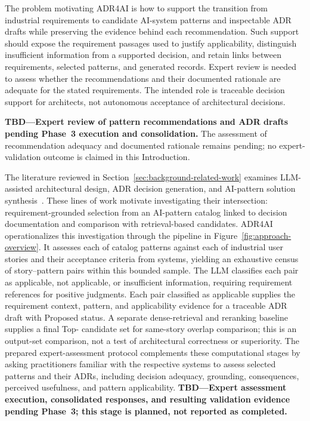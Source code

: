 The problem motivating ADR4AI is how to support the transition from industrial
requirements to candidate AI-system patterns and inspectable ADR drafts while
preserving the evidence behind each recommendation. Such support should expose
the requirement passages used to justify applicability, distinguish insufficient
information from a supported decision, and retain links between requirements,
selected patterns, and generated records. Expert review is needed to assess
whether the recommendations and their documented rationale are adequate for the
stated requirements. The intended role is traceable decision support for
architects, not autonomous acceptance of architectural decisions.

\noindent\textbf{TBD---Expert review of pattern recommendations and ADR drafts
pending Phase~3 execution and consolidation.}
The assessment of recommendation adequacy and documented rationale remains
pending; no expert-validation outcome is claimed in this Introduction.

The literature reviewed in Section~\ref{sec:background-related-work} examines
LLM-assisted architectural design, ADR decision generation, and AI-pattern
solution synthesis~\cite{cervantes2026assistants,dhar2024generating,oliveira2026designpartners}.
These lines of work motivate investigating their intersection: requirement-grounded
selection from an AI-pattern catalog linked to decision documentation and
comparison with retrieval-based candidates. ADR4AI operationalizes this
investigation through the pipeline in Figure~\ref{fig:approach-overview}.
It assesses each of \StudyPatternCount{} catalog patterns against each of
\StudyStoryCount{} industrial user stories and their acceptance criteria from
\StudySystemCount{} systems, yielding an exhaustive census of
\StudyAssessmentCount{} story--pattern pairs within this bounded sample.
The LLM classifies each pair as applicable, not applicable, or insufficient
information, requiring requirement references for positive judgments.
Each pair classified as applicable supplies the requirement context, pattern,
and applicability evidence for a traceable ADR draft with Proposed status.
A separate dense-retrieval and reranking baseline supplies a final
Top-\RagFinalCount{} candidate set for same-story overlap comparison; this is
an output-set comparison, not a test of architectural correctness or superiority.
The prepared expert-assessment protocol complements these computational stages
by asking practitioners familiar with the respective systems to assess selected
patterns and their ADRs, including decision adequacy, grounding, consequences,
perceived usefulness, and pattern applicability.
\textbf{TBD---Expert assessment execution, consolidated responses, and resulting
validation evidence pending Phase~3; this stage is planned, not reported as
completed.}

